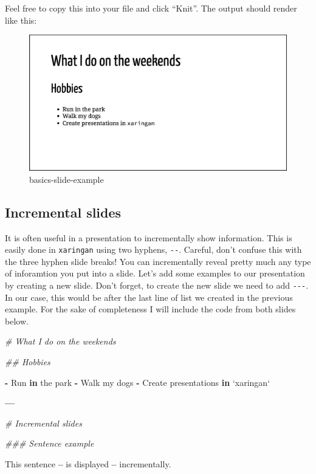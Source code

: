 \documentclass[
]{book}
\newenvironment{Shaded}{\begin{snugshade}}{\end{snugshade}}
\newcommand{\CommentTok}[1]{\textcolor[rgb]{0.37,0.37,0.37}{\textit{#1}}}
\newcommand{\ControlFlowTok}[1]{\textcolor[rgb]{0.27,0.27,0.27}{\textbf{#1}}}
\newcommand{\DataTypeTok}[1]{\textcolor[rgb]{0.27,0.27,0.27}{#1}}
\newcommand{\NormalTok}[1]{#1}
\newcommand{\OperatorTok}[1]{\textcolor[rgb]{0.43,0.43,0.43}{\textbf{#1}}}
\newcommand{\StringTok}[1]{\textcolor[rgb]{0.5,0.5,0.5}{#1}}
\begin{document}
Feel free to copy this into your file and click ``Knit''. The output should render like this:

\begin{figure}
\centering
\includegraphics{img/02_basics-slide-example.png}
\caption{basics-slide-example}
\end{figure}

\hypertarget{incremental-slides}{%
\subsection{Incremental slides}\label{incremental-slides}}

It is often useful in a presentation to incrementally show information. This is easily done in \texttt{xaringan} using two hyphens, \texttt{-\/-}. Careful, don't confuse this with the three hyphen slide breaks! You can incrementally reveal pretty much any type of inforamtion you put into a slide. Let's add some examples to our presentation by creating a new slide. Don't forget, to create the new slide we need to add \texttt{-\/-\/-}. In our case, this would be after the last line of list we created in the previous example. For the sake of completeness I will include the code from both slides below.

\begin{Shaded}
\begin{Highlighting}[]
\CommentTok{# What I do on the weekends}

\CommentTok{## Hobbies}

\OperatorTok{-}\StringTok{ }\NormalTok{Run }\ControlFlowTok{in}\NormalTok{ the park}
\OperatorTok{-}\StringTok{ }\NormalTok{Walk my dogs}
\OperatorTok{-}\StringTok{ }\NormalTok{Create presentations }\ControlFlowTok{in} \StringTok{`}\DataTypeTok{xaringan}\StringTok{`}

\OperatorTok{---}

\CommentTok{# Incremental slides}

\CommentTok{### Sentence example}

\NormalTok{This sentence}
\OperatorTok{--}
\NormalTok{is displayed }
\OperatorTok{--}
\NormalTok{incrementally. }
\end{Highlighting}
\end{Shaded}
\end{document}
